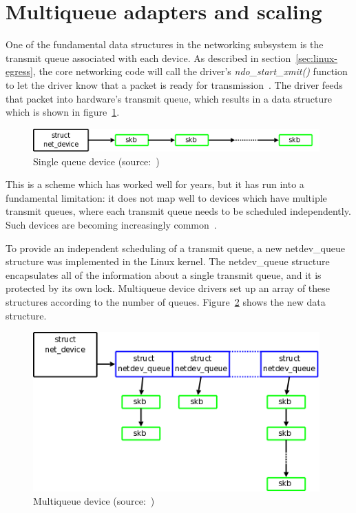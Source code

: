 
\section{Multiqueue adapters and scaling}\label{sec:linux-scaling}
One of the fundamental data structures in the networking subsystem is the transmit queue associated with each device.
As described in section~\ref{sec:linux-egress}, the core networking code will call the driver's {\it{ndo\_start\_xmit()}}
function to let the driver know that a packet is ready for transmission~\cite{mq-networking}.
The driver feeds that packet into hardware's transmit queue,
which results in a data structure which is shown in figure~\ref{fig:linux-queue-old}.
\begin{figure}
	\centering
	\includegraphics[width=11cm,keepaspectratio]{fig/net-queue-old.png}
	\caption{Single queue device (source:~\cite{mq-networking})}
	\label{fig:linux-queue-old}
\end{figure}

This is a scheme which has worked well for years, but it has run into a fundamental limitation:
it does not map well to devices which have multiple transmit queues,
where each transmit queue needs to be scheduled independently.
Such devices are becoming increasingly common~\cite{mq-networking}.

To provide an independent scheduling of a transmit queue,
a new netdev\_queue structure was implemented in the Linux kernel.
The netdev\_queue structure encapsulates all of the information about a single transmit queue,
and it is protected by its own lock.
Multiqueue device drivers set up an array of these structures according to the number of queues.
Figure~\ref{fig:linux-queue-mq} shows the new data structure.
\begin{figure}
	\centering
	\includegraphics[width=11cm,keepaspectratio]{fig/net-queue-mq.png}
	\caption{Multiqueue device (source:~\cite{mq-networking})}
	\label{fig:linux-queue-mq}
\end{figure}

